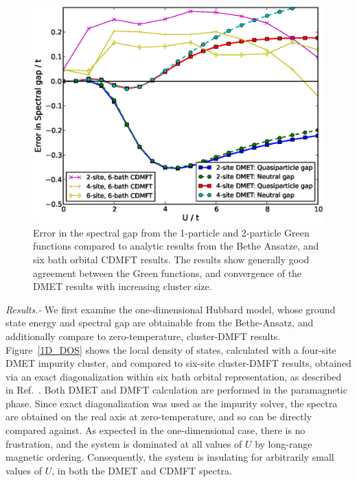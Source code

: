 \documentclass[aps,twocolumn,nobibnotes]{revtex4}
\begin{document}
\begin{figure}
\begin{center}
    \vspace{-2mm}
\includegraphics[scale=0.425]{Plots/1D_Gap/Hubbard_Gap.eps}
\end{center}
    \vspace{-8mm}
\caption{Error in the spectral gap from the 1-particle and 2-particle Green functions compared to analytic results
from the Bethe Ansatze\cite{Ovchinni1970}, and six bath orbital CDMFT results\cite{Go2009}. The results show generally good agreement between the Green functions, and 
convergence of the DMET results with increasing cluster size.}
\label{1D_GAP}
\end{figure}

\emph{Results.-} We first examine the one-dimensional Hubbard model, whose ground state energy\cite{Lieb68} and spectral gap\cite{Ovchinni1970} are 
obtainable from the Bethe-Ansatz, and additionally compare to
zero-temperature, cluster-DMFT results\cite{Go2009}. Figure~\ref{1D_DOS} shows the local density of states, calculated with a four-site DMET 
impurity cluster, and compared to six-site cluster-DMFT results, obtained via an exact diagonalization within six bath orbital representation, 
as described in Ref.~. Both DMET and DMFT calculation are performed in the paramagnetic phase. 
Since exact diagonalization was used as the impurity solver, 
the spectra are obtained on the real axis at zero-temperature, and so can be directly compared against. As expected in the one-dimensional case, there is no
frustration, and the system is dominated at all values of $U$ by long-range magnetic ordering\cite{Lieb68}. Consequently, 
the system is insulating for arbitrarily small values of $U$, in both the DMET and CDMFT spectra. 
\end{document}
